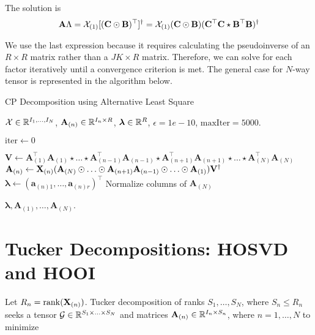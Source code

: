 The solution is
\begin{equation}
    \mathbf{A}\Lambda = \mathcal{X}_{(1)}[(\mathbf{C}\odot \mathbf{B})^\top]^\dag = \mathcal{X}_{(1)}(\mathbf{C}\odot \mathbf{B})(\mathbf{C}^\top \mathbf{C}\star \mathbf{B}^\top\mathbf{B})^\dag
\end{equation}

We use the last expression because it requires calculating the pseudoinverse of an $R\times R$ matrix rather than a $JK\times R$ matrix. Therefore, we can solve for each factor iteratively until a convergence criterion is met. The general case for $N$-way tensor is represented in the algorithm below.

\begin{algorithm}
    \caption{CP Decomposition using Alternative Least Square}
    \label{alg:cap}
    \begin{algorithmic}
        \Require $\mathcal{X}\in{\mathbb{R}}^{I_1,\ldots, I_N}$, $\mathbf{A}_{(n)}\in{\mathbb{R}}^{I_n\times R}$, $\bm{\lambda}\in{\mathbb{R}}^R$, $\epsilon = 1e-10$, $\text{maxIter} = 5000$.

        \State $\text{iter} \gets 0$


        \State $\mathbf{V}\gets \mathbf{A}_{(1)}^\top \mathbf{A}_{(1)} \star \ldots \star \mathbf{A}_{(n-1)}^\top \mathbf{A}_{(n-1)} \star \mathbf{A}_{(n+1)}^\top \mathbf{A}_{(n+1)}\star\ldots\star \mathbf{A}_{(N)}^\top \mathbf{A}_{(N)}$
        \State $\mathbf{A}_{(n)} \gets \mathbf{X}_{(n)} (\mathbf{A}_{(N)}\odot\ldots\odot \mathbf{A}_{(n+1)}\mathbf{A}_{(n-1)} \odot\ldots\odot \mathbf{A}_{(1)})\mathbf{V}^\dag$
        \State $\bm{\lambda} \gets (\mathbf{a}_{(n)1}, \dots, \mathbf{a}_{(n)r})^\top$
        \State Normalize columns of $\mathbf{A}_{(N)}$
        \EndFor

        \EndWhile
        \Ensure $\bm{\lambda}, \mathbf{A}_{(1)},\ldots,\mathbf{A}_{(N)}$.
    \end{algorithmic}
\end{algorithm}

\section{Tucker Decompositions: HOSVD and HOOI}
Let $R_n=\mathrm{rank}(\mathbf{X}_{(n)})$. Tucker decomposition of ranks $S_1,\ldots,S_N$, where $S_n\le R_n$ seeks a tensor $\mathcal{G}\in{\mathbb{R}}^{S_1\times\ldots\times S_N}$ and matrices $\mathbf{A}_{(n)}\in{\mathbb{R}}^{I_n \times S_n}$, where $n=1,\ldots, N$ to minimize

